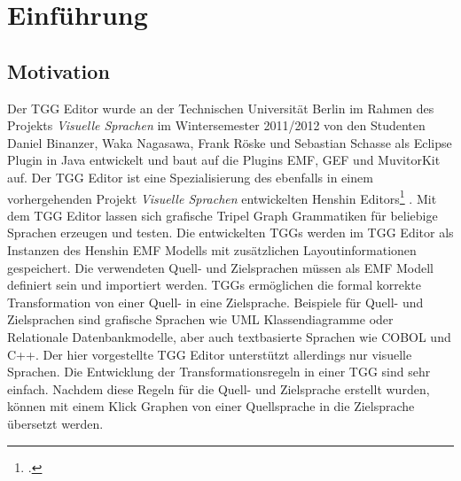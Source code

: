 \chapter{Einführung}

\section{Motivation}
Der TGG Editor wurde an der Technischen Universität Berlin im Rahmen des Projekts \emph{Visuelle Sprachen} im Wintersemester 2011/2012 von den Studenten Daniel Binanzer, Waka Nagasawa, Frank Röske und Sebastian Schasse als Eclipse Plugin in Java entwickelt und baut auf die Plugins EMF, GEF und MuvitorKit auf. Der TGG Editor ist eine Spezialisierung des ebenfalls in einem vorhergehenden Projekt \emph{Visuelle Sprachen} entwickelten Henshin Editors\footcite[][\url{http://tfs.cs.tu-berlin.de/henshin/}]{henshinwebsite}
. Mit dem TGG Editor lassen sich grafische Tripel Graph Grammatiken für beliebige Sprachen erzeugen und testen. Die entwickelten TGGs werden im TGG Editor als Instanzen des Henshin EMF Modells mit zusätzlichen Layoutinformationen gespeichert. Die verwendeten Quell- und Zielsprachen müssen als EMF Modell definiert sein und importiert werden. TGGs ermöglichen die formal korrekte Transformation von einer Quell- in eine Zielsprache. Beispiele für Quell- und Zielsprachen sind grafische Sprachen wie UML Klassendiagramme oder Relationale Datenbankmodelle, aber auch textbasierte Sprachen wie COBOL und C++. Der hier vorgestellte TGG Editor unterstützt allerdings nur visuelle Sprachen. Die Entwicklung der Transformationsregeln in einer TGG sind sehr einfach. Nachdem diese Regeln für die Quell- und Zielsprache erstellt wurden, können mit einem Klick Graphen von einer Quellsprache in die Zielsprache übersetzt werden.


%
%
